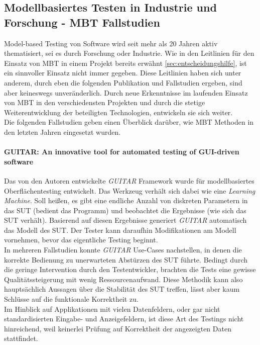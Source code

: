 \subsection{Modellbasiertes Testen in Industrie und Forschung - MBT Fallstudien}

Model-based Testing von Software wird seit mehr als 20 Jahren aktiv thematisiert, \cite{utting_practical_2007} sei es durch Forschung oder Industrie. Wie in den Leitlinien für den Einsatz von MBT in einem Projekt bereits erwähnt \ref{sec:entscheidungshilfe}, ist ein sinnvoller Einsatz nicht immer gegeben. Diese Leitlinien haben sich unter anderem, durch eben die folgenden Publikation und Fallstudien ergeben, sind aber keineswegs unveränderlich. Durch neue Erkenntnisse im laufenden Einsatz von MBT in den verschiedensten Projekten und durch die stetige Weiterentwicklung der beteiligten Technologien, entwickeln sie sich weiter.\\
Die folgenden Fallstudien geben einen Überblick darüber, wie MBT Methoden in den letzten Jahren eingesetzt wurden.

\paragraph{GUITAR: An innovative tool for automated testing of GUI-driven software \cite{nguyen_guitar:_2014}}Das von den Autoren entwickelte \textit{GUITAR} Framework wurde für modellbasiertes Oberflächentesting entwickelt. Das Werkzeug verhält sich dabei wie eine \textit{Learning Machine}. Soll heißen, es gibt eine endliche Anzahl von diskreten Parametern in das SUT (bedient das Programm) und beobachtet die Ergebnisse (wie sich das SUT verhält). Basierend auf diesen Ergebnisse generiert \textit{GUITAR} automatisch das Modell des SUT. Der Tester kann daraufhin Modifikationen am Modell vornehmen, bevor das eigentliche Testing beginnt.\\ 
In mehreren Fallstudien konnte \textit{GUITAR} Use-Cases nachstellen, in denen die korrekte Bedienung zu unerwarteten Abstürzen des SUT führte. Bedingt durch die geringe Intervention durch den Testentwickler, brachten die Tests eine gewisse Qualitätssteigerung mit wenig Ressourcenaufwand. Diese Methodik kann also hauptsächlich Aussagen über die Stabilität des SUT treffen, lässt aber kaum Schlüsse auf die funktionale Korrektheit zu.\\
Im Hinblick auf Applikationen mit vielen Datenfeldern, oder gar nicht standardisierten Eingabe- und Anzeigefeldern, ist diese Art des Testings nicht hinreichend, weil keinerlei Prüfung auf Korrektheit der angezeigten Daten stattfindet.


